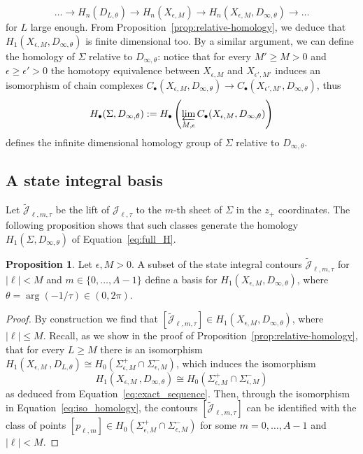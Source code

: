 \documentclass[12pt,reqno]{amsart}
\theoremstyle{definition}
\newtheorem{proposition}[theorem]{Proposition}
\newtheorem{lemma}[theorem]{Lemma}
\def\calJ{\mathcal J}
\def\be{\begin{equation}}
\def\ee{\end{equation}}
\renewcommand{\=}{\;=\;}
\begin{document}
\be\label{eq:exact_sequence}
\ldots\to H_{n}(D_{L,\theta})\to H_{n}(X_{\epsilon,M})\to H_n(X_{\epsilon,M},D_{\infty,\theta})\to\ldots 
\ee
for $L$ large enough. From Proposition~\ref{prop:relative-homology}, we deduce that $H_1(X_{\epsilon,M},D_{\infty,\theta})$ is finite dimensional too.
%
By a similar argument, we can define the homology of $\Sigma$ relative to $D_{\infty,\theta}$: notice that for every $M'\geq M>0$ and $\epsilon\geq\epsilon'>0$ the homotopy equivalence between $X_{\epsilon,M}$ and $X_{\epsilon',M'}$ induces an isomorphism of chain complexes $C_\bullet(X_{\epsilon,M},D_{\infty,\theta})\to C_\bullet(X_{\epsilon',M'},D_{\infty,\theta})$, thus 
\be\label{eq:full_H}
H_\bullet(\Sigma,D_{\infty,\theta}):=H_\bullet\left(\varprojlim_{M,\epsilon} C_\bullet(X_{\epsilon,M},D_{\infty,\theta})\right)
\ee 
defines the infinite dimensional homology group of $\Sigma$ relative to $D_{\infty,\theta}$.  
\subsection{A state integral basis}\label{sec:state_int_basis}
Let $\tilde{\calJ}_{\ell,m,\tau}$ be the lift of $\calJ_{\ell,\tau}$ to the $m$-th sheet of $\Sigma$ in the $z_+$ coordinates. The following proposition shows that such classes generate the homology $H_1(\Sigma,D_{\infty,\theta})$ of Equation~\eqref{eq:full_H}.
\begin{proposition}\label{prop:base_homology}
Let $\epsilon, M>0$. A subset of the state integral contours $\tilde{\calJ}_{\ell,m,\tau}$ for $|\ell|<M$ and $m\in\{0,\dots,A-1\}$ define a basis for $H_1(X_{\epsilon,M},D_{\infty,\theta})$, where $\theta=\arg(-1/\tau)\in(0,2\pi)$. 
\end{proposition}
\begin{proof}
By construction we find that $[\tilde{\calJ}_{\ell,m,\tau}]\in H_1(X_{\epsilon,M}, D_{\infty,\theta})$, where $|\ell|\leq M$. Recall, as we show in the proof of Proposition~\ref{prop:relative-homology}, that for every $L\geq M$ there is an isomorphism 
$H_1(X_{\epsilon,M}\,,D_{L,\theta})\cong H_0(\Sigma_{\epsilon,M}^{+}\cap\Sigma_{\epsilon,M}^{-})$, which induces the isomorphism
\be\label{eq:iso_homology}
H_1(X_{\epsilon,M}\,,D_{\infty,\theta})\cong H_0(\Sigma_{\epsilon,M}^{+}\cap\Sigma_{\epsilon,M}^{-})
\ee
as deduced from Equation~\eqref{eq:exact_sequence}. 
Then, through the isomorphism in Equation~\eqref{eq:iso_homology}, the contours $[\tilde{\calJ}_{\ell,m,\tau}]$ can be identified with the class of points $[p_{\ell,m}]\in H_0(\Sigma_{\epsilon,M}^{+}\cap\Sigma_{\epsilon,M}^{-})$ for some $m=0,\ldots,A-1$ and $|\ell|<M$.   
\end{proof}
\end{document}
